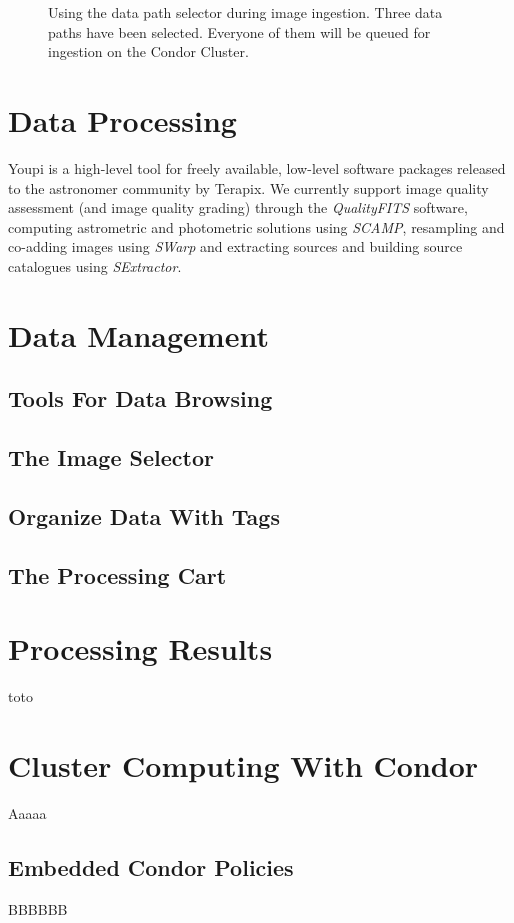\documentclass[11pt,twoside]{article}  %
\begin{document}
\begin{figure}[t]
\caption{Using the data path selector during image ingestion. Three data paths have 
been selected. Everyone of them will be queued for ingestion on the Condor Cluster.}\label{fig:pathsel}
\end{figure}

\section{Data Processing}

Youpi is a high-level tool for freely available, low-level software packages released 
to the astronomer community by Terapix. We currently support image quality assessment 
(and image quality grading) through the \emph{QualityFITS} software, computing astrometric 
and photometric solutions using \emph{SCAMP}, resampling and co-adding images using \emph{SWarp} 
and extracting sources and building source catalogues using \emph{SExtractor}.

\section{Data Management}
\subsection{Tools For Data Browsing}
\subsection{The Image Selector}\label{sec:ims}
\subsection{Organize Data With Tags}
\subsection{The Processing Cart}

\section{Processing Results}

toto

\section{Cluster Computing With Condor}
Aaaaa
\subsection{Embedded Condor Policies}
BBBBBB
\end{document}
